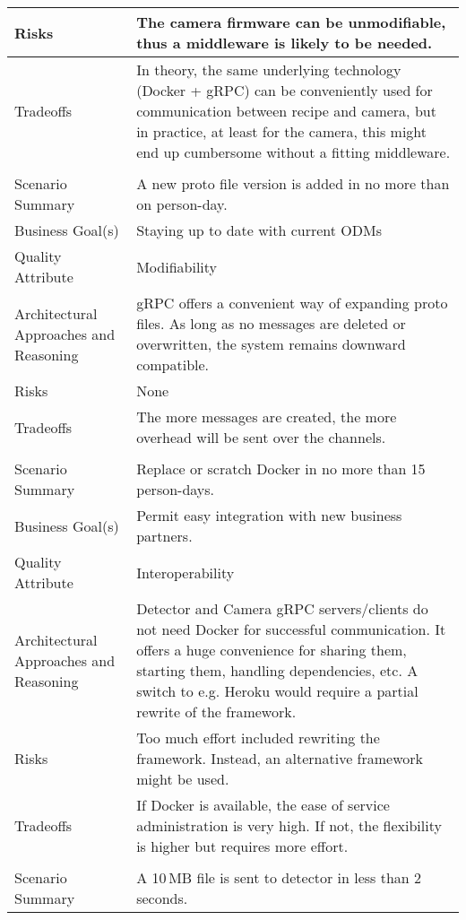 {\begin{longtable}{| P{0.2\textwidth} | P{0.74\textwidth} |}
Risks &  The camera firmware can be unmodifiable, thus a middleware is likely to be needed. \\ \hline
Tradeoffs & In theory, the same underlying technology (Docker + gRPC) can be conveniently used for communication between recipe and camera, but in practice, at least for the camera, this might end up cumbersome without a fitting middleware. \\ \hline
{}
 \\ \hline
Scenario Summary & A new proto file version is added in no more than on person-day.\\ \hline
Business Goal(s) & Staying up to date with current ODMs\\ \hline
Quality Attribute & Modifiability\\ \hline
Architectural Approaches and Reasoning & gRPC offers a convenient way of expanding proto files. As long as no messages are deleted or overwritten, the system remains downward compatible.\\ \hline
Risks &  None\\ \hline
Tradeoffs &  The more messages are created, the more overhead will be sent over the channels.\\ \hline
{}
 \\ \hline
Scenario Summary & Replace or scratch Docker in no more than 15 person-days.\\ \hline
Business Goal(s) & Permit easy integration with new business partners. \\ \hline
Quality Attribute & Interoperability\\ \hline
Architectural Approaches and Reasoning & Detector and Camera gRPC servers/clients do not need Docker for successful communication. It offers a huge convenience for sharing them, starting them, handling dependencies, etc. A switch to e.g. Heroku would require a partial rewrite of the framework.\\ \hline
Risks &  Too much effort included rewriting the framework. Instead, an alternative framework might be used.\\ \hline
Tradeoffs & If Docker is available, the ease of service administration is very high. If not, the flexibility is higher but requires more effort.\\ \hline
{}
 \\ \hline
Scenario Summary & A 10\,MB file is sent to detector in less than 2 seconds. \\ \hline

\end{longtable}}
